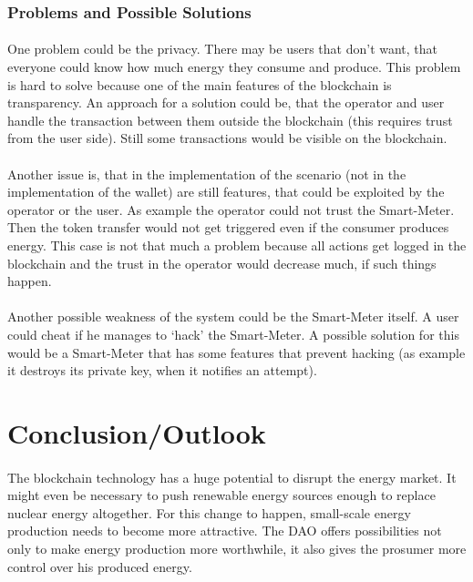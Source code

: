 \documentclass{scrartcl}
\begin{document}
	\subsubsection{Problems and Possible Solutions}
	
	\paragraph{}
	One problem could be the privacy. There may be users that don’t want, that everyone could know how much energy they consume and produce. This problem is hard to solve because one of the main features of the blockchain is transparency. An approach for a solution could be, that the operator and user handle the transaction between them outside the blockchain (this requires trust from the user side). Still some transactions would be visible on the blockchain.
	
	\paragraph{}
	Another issue is, that in the implementation of the scenario (not in the implementation of the wallet) are still features, that could be exploited by the operator or the user. As example the operator could not trust the Smart-Meter. Then the token transfer would not get triggered even if the consumer produces energy. This case is not that much a problem because all actions get logged in the blockchain and the trust in the operator would decrease much, if such things happen. 
	
	\paragraph{}
	Another possible weakness of the system could be the Smart-Meter itself. A user could cheat if he manages to ‘hack’ the Smart-Meter. A possible solution for this would be a Smart-Meter that has some features that prevent hacking (as example it destroys its private key, when it notifies an attempt).
	
\section{Conclusion/Outlook}
    
    \paragraph{}
    The blockchain technology has a huge potential to disrupt the energy market. It might even be necessary to push renewable energy sources enough to replace nuclear energy altogether. For this change to happen, small-scale energy production needs to become more attractive. The DAO offers possibilities not only to make energy production more worthwhile, it also gives the prosumer more control over his produced energy.
    
\end{document}
